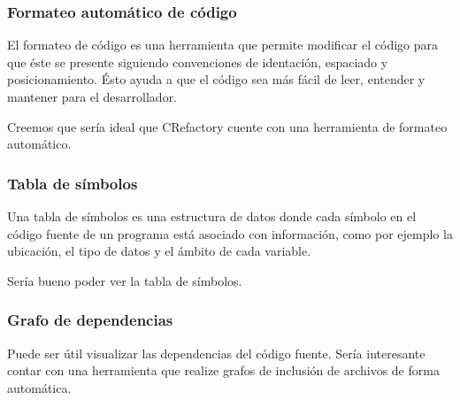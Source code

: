 \documentclass[a4paper,oneside,12pt]{article}
\begin{document}
\subsubsection{Formateo autom\'atico de c\'odigo}
El formateo de c\'odigo es una herramienta que permite modificar el c\'odigo para que \'este se presente siguiendo convenciones de identaci\'on, espaciado y posicionamiento. \'Esto ayuda a que el c\'odigo sea m\'as f\'acil de leer, entender y mantener para el desarrollador.

Creemos que ser\'ia ideal que CRefactory cuente con una herramienta de formateo autom\'atico.


\subsubsection{Tabla de s\'imbolos}
Una tabla de s\'imbolos es una estructura de datos donde cada s\'imbolo en el c\'odigo fuente de un programa est\'a asociado con informaci\'on, como por ejemplo la ubicaci\'on, el tipo de datos y el \'ambito de cada variable.

Ser\'ia bueno poder ver la tabla de s\'imbolos.

\subsubsection{Grafo de dependencias}
Puede ser \'util visualizar las dependencias del c\'odigo fuente. Ser\'ia interesante contar con una herramienta que realize grafos de inclusi\'on de archivos de forma autom\'atica.
\end{document}

